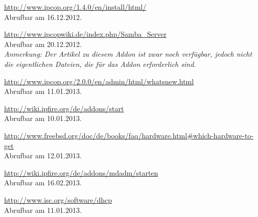 \documentclass[a4paper,12pt]{scrartcl}
\begin{document}
\renewcommand\refname{Quellenverzeichnis}
\begin{thebibliography}{999}

\url{http://www.ipcop.org/1.4.0/en/install/html/}
\\Abrufbar am 16.12.2012.

\url{http://www.ipcopwiki.de/index.php/Samba\_Server}
\\Abrufbar am 20.12.2012.
\\\textit{Anmerkung: Der Artikel zu diesem Addon ist zwar noch verf\"ugbar, jedoch
nicht die eigentlichen Dateien, die f\"ur das Addon erforderlich sind.}

\url{http://www.ipcop.org/2.0.0/en/admin/html/whatsnew.html}
\\Abrufbar am 11.01.2013.

\url{http://wiki.ipfire.org/de/addons/start}
\\Abrufbar am 10.01.2013.

\url{http://www.freebsd.org/doc/de/books/faq/hardware.html\#which-hardware-to-get}
\\Abrufbar am 12.01.2013.

\url{http://wiki.ipfire.org/de/addons/mdadm/starten}
\\Abrufbar am 16.02.2013.

\url{http://www.isc.org/software/dhcp}
\\Abrufbar am 11.01.2013.

\end{thebibliography}
\end{document}

